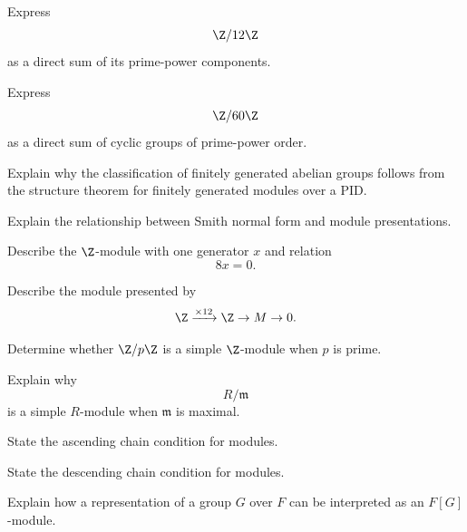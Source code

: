 \begin{exercise}[3]
Express
\[ \Z/12\Z \]
as a direct sum of its prime-power components.
\end{exercise}

\begin{exercise}[3]
Express
\[ \Z/60\Z \]
as a direct sum of cyclic groups of prime-power order.
\end{exercise}

\begin{exercise}[2]
Explain why the classification of finitely generated abelian groups follows
from the structure theorem for finitely generated modules over a PID.
\end{exercise}

\begin{exercise}[2]
Explain the relationship between Smith normal form and module
presentations.
\end{exercise}

\begin{exercise}[2]
Describe the \(\Z\)-module with one generator \(x\) and relation
\[ 8x=0. \]
\end{exercise}

\begin{exercise}[3]
Describe the module presented by
\[ \Z\xrightarrow{\times 12}\Z\to M\to0. \]
\end{exercise}

\begin{exercise}[2]
Determine whether \(\Z/p\Z\) is a simple \(\Z\)-module when \(p\) is prime.
\end{exercise}

\begin{exercise}[2]
Explain why
\[ R/\mathfrak m \]
is a simple \(R\)-module when \(\mathfrak m\) is maximal.
\end{exercise}

\begin{exercise}[2]
State the ascending chain condition for modules.
\end{exercise}

\begin{exercise}[2]
State the descending chain condition for modules.
\end{exercise}

\begin{exercise}[3]
Explain how a representation of a group \(G\) over \(F\) can be interpreted
as an \(F[G]\)-module.
\end{exercise}

